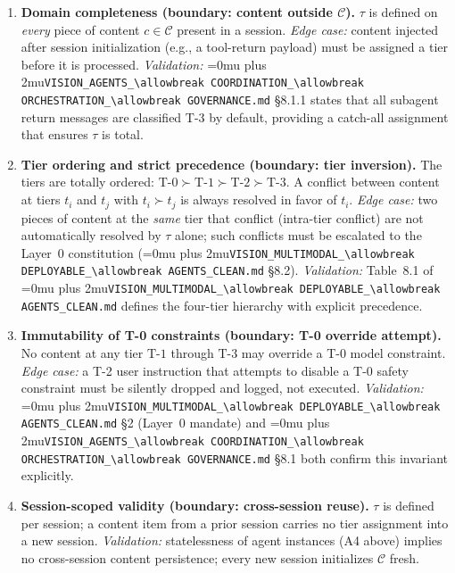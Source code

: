 \documentclass[12pt]{article}
\theoremstyle{definition}
\DeclareRobustCommand{\code}[1]{\begingroup\Urlmuskip=0mu plus 2mu\relax\nolinkurl{#1}\endgroup}
\newcommand{\VisionClean}{\code{VISION\_MULTIMODAL\_\allowbreak DEPLOYABLE\_\allowbreak AGENTS\_CLEAN.md}}
\newcommand{\VisionGov}{\code{VISION\_AGENTS\_\allowbreak COORDINATION\_\allowbreak ORCHESTRATION\_\allowbreak GOVERNANCE.md}}
\begin{document}
\begin{enumerate}[label=\textbf{T\arabic*.}, leftmargin=*, widest=T9]

  \item \textbf{Domain completeness (boundary: content outside
        $\mathcal{C}$).}
        $\tau$ is defined on \emph{every} piece of content
        $c \in \mathcal{C}$ present in a session.
        \emph{Edge case:} content injected after session initialization
        (e.g., a tool-return payload) must be assigned a tier before
        it is processed.
        \emph{Validation:} \VisionGov{} \S8.1.1 states that all
        subagent return messages are classified T-3 by default,
        providing a catch-all assignment that ensures $\tau$ is total.

  \item \textbf{Tier ordering and strict precedence (boundary:
        tier inversion).}
        The tiers are totally ordered:
        $\mathrm{T\text{-}0} \succ \mathrm{T\text{-}1}
         \succ \mathrm{T\text{-}2} \succ \mathrm{T\text{-}3}$.
        A conflict between content at tiers $t_i$ and $t_j$ with
        $t_i \succ t_j$ is always resolved in favor of $t_i$.
        \emph{Edge case:} two pieces of content at the \emph{same}
        tier that conflict (intra-tier conflict) are not automatically
        resolved by $\tau$ alone; such conflicts must be escalated to
        the Layer~0 constitution (\VisionClean{} \S8.2).
        \emph{Validation:} Table~8.1 of \VisionClean{} defines the
        four-tier hierarchy with explicit precedence.

  \item \textbf{Immutability of T-0 constraints (boundary: T-0
        override attempt).}
        No content at any tier $\mathrm{T\text{-}1}$ through
        $\mathrm{T\text{-}3}$ may override a T-0 model constraint.
        \emph{Edge case:} a T-2 user instruction that attempts to
        disable a T-0 safety constraint must be silently dropped and
        logged, not executed.
        \emph{Validation:} \VisionClean{} \S2 (Layer~0 mandate) and
        \VisionGov{} \S8.1 both confirm this invariant explicitly.

  \item \textbf{Session-scoped validity (boundary: cross-session
        reuse).}
        $\tau$ is defined per session; a content item from a prior
        session carries no tier assignment into a new session.
        \emph{Validation:} statelessness of agent instances
        (A4 above) implies no cross-session content persistence;
        every new session initializes $\mathcal{C}$ fresh.


\end{enumerate}
\end{document}
